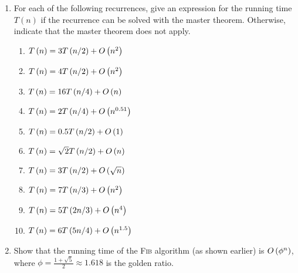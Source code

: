 \begin{exercises}
\begin{enumerate}
    \item For each of the following recurrences, give an expression for the running time $T\left(n\right)$ if the recurrence can be solved with the master theorem. Otherwise, indicate that the master theorem does not apply.
    \begin{enumerate}
        \item $T\left(n\right) = 3T\left(n/2\right) + O\left(n^2 \right)$
        \item $T\left(n\right) = 4T\left(n/2\right) + O\left(n^2 \right)$
        \item $T\left(n\right) = 16T\left(n/4\right) + O\left(n \right)$
        \item $T\left(n\right) = 2T\left(n/4\right) + O\left(n^{0.51} \right)$
        \item $T\left(n\right) = 0.5T\left(n/2\right) + O\left(1 \right)$
        \item $T\left(n\right) = \sqrt{2}T\left(n/2\right) + O\left(n \right)$
        \item $T\left(n\right) = 3T\left(n/2\right) + O\left(\sqrt{n} \right)$
        \item $T\left(n\right) = 7T\left(n/3\right) + O\left(n^2 \right)$
        \item $T\left(n\right) = 5T\left(2n/3\right) + O\left(n^4 \right)$
        \item $T\left(n\right) = 6T\left(5n/4\right) + O\left(n^{1.5} \right)$
    \end{enumerate}
    
    \item[\challenge] Show that the running time of the \textsc{Fib} algorithm (as shown earlier) is $O\left(\phi^n \right)$, where $\phi = \frac{1+\sqrt{5}}{2} \approx 1.618$ is the golden ratio.
\end{enumerate}
\end{exercises}